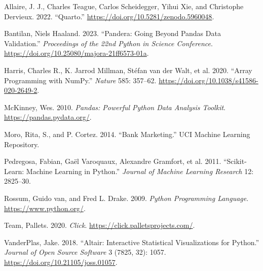 \documentclass[
  letterpaper,
  DIV=11,
  numbers=noendperiod]{scrartcl}
\newlength{\cslhangindent}
\newenvironment{CSLReferences}[2] %
 {\begin{list}{}{%
  \setlength{\itemindent}{0pt}
  \setlength{\leftmargin}{0pt}
  \setlength{\parsep}{0pt}
  \ifodd #1
   \setlength{\leftmargin}{\cslhangindent}
   \setlength{\itemindent}{-1\cslhangindent}
  \fi
  \setlength{\itemsep}{#2\baselineskip}}}
 {\end{list}}
\begin{document}
\label{refs}
\begin{CSLReferences}{1}{0}
Allaire, J. J., Charles Teague, Carlos Scheidegger, Yihui Xie, and
Christophe Dervieux. 2022. {``{Quarto}.''}
\url{https://doi.org/10.5281/zenodo.5960048}.

Bantilan, Niels Haaland. 2023. {``Pandera: Going Beyond Pandas Data
Validation.''} \emph{Proceedings of the 22nd Python in Science
Conference}. \url{https://doi.org/10.25080/majora-21ff6573-01a}.

Harris, Charles R., K. Jarrod Millman, Stéfan van der Walt, et al. 2020.
{``Array Programming with {NumPy}.''} \emph{Nature} 585: 357--62.
\url{https://doi.org/10.1038/s41586-020-2649-2}.

McKinney, Wes. 2010. \emph{Pandas: Powerful Python Data Analysis
Toolkit}. \url{https://pandas.pydata.org/}.

Moro, Rita, S., and P. Cortez. 2014. {``{Bank Marketing}.''} UCI Machine
Learning Repository.

Pedregosa, Fabian, Gaël Varoquaux, Alexandre Gramfort, et al. 2011.
{``Scikit-Learn: Machine Learning in Python.''} \emph{Journal of Machine
Learning Research} 12: 2825--30.

Rossum, Guido van, and Fred L. Drake. 2009. \emph{Python Programming
Language}. \url{https://www.python.org/}.

Team, Pallets. 2020. \emph{Click}.
\url{https://click.palletsprojects.com/}.

VanderPlas, Jake. 2018. {``Altair: Interactive Statistical
Visualizations for Python.''} \emph{Journal of Open Source Software} 3
(7825, 32): 1057. \url{https://doi.org/10.21105/joss.01057}.

\end{CSLReferences}
\end{document}
